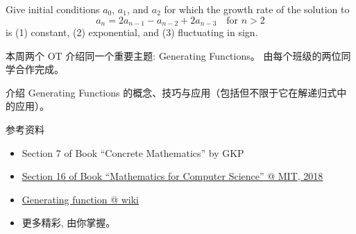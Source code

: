 \documentclass[a4paper, justified]{tufte-handout}
\begin{document}
\begin{solution}
\end{solution}

\beginoptional

\begin{problem}
  Give initial conditions $a_0$, $a_1$, and $a_2$ for which the growth rate of the solution to
  \[
    a_{n} = 2a_{n-1} - a_{n-2} + 2a_{n-3} \quad \text{for } n > 2
  \]
  is (1) constant, (2) exponential, and (3) fluctuating in sign.
\end{problem}

\begin{solution}
\end{solution}

\beginot

% 

本周两个 OT 介绍同一个重要主题: Generating Functions。
由每个班级的两位同学合作完成。

\begin{ot}
  介绍 Generating Functions 的概念、技巧与应用（包括但不限于它在解递归式中的应用）。

  \noindent 参考资料
  \begin{itemize}
    \item Section 7 of Book ``Concrete Mathematics'' by GKP~\cite{Book:GKP}
    \item \href{https://courses.csail.mit.edu/6.042/spring18/mcs.pdf}{Section 16 of Book ``Mathematics for Computer Science'' @ MIT, 2018}
    \item \href{https://en.wikipedia.org/wiki/Generating\_function}{Generating function @ wiki}
    \item 更多精彩, 由你掌握。
  \end{itemize}
\end{ot}

\end{document}
